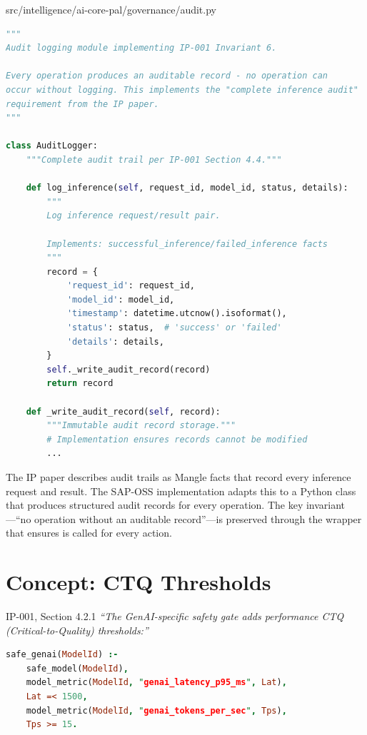 \begin{implbox}{src/intelligence/ai-core-pal/governance/audit.py}
\begin{lstlisting}[language=Python]
"""
Audit logging module implementing IP-001 Invariant 6.

Every operation produces an auditable record - no operation can
occur without logging. This implements the "complete inference audit"
requirement from the IP paper.
"""

class AuditLogger:
    """Complete audit trail per IP-001 Section 4.4."""
    
    def log_inference(self, request_id, model_id, status, details):
        """
        Log inference request/result pair.
        
        Implements: successful_inference/failed_inference facts
        """
        record = {
            'request_id': request_id,
            'model_id': model_id,
            'timestamp': datetime.utcnow().isoformat(),
            'status': status,  # 'success' or 'failed'
            'details': details,
        }
        self._write_audit_record(record)
        return record
    
    def _write_audit_record(self, record):
        """Immutable audit record storage."""
        # Implementation ensures records cannot be modified
        ...
\end{lstlisting}
\end{implbox}

\begin{adaptbox}
The IP paper describes audit trails as Mangle facts that record every inference request and result. The SAP-OSS implementation adapts this to a Python  class that produces structured audit records for every operation. The key invariant---``no operation without an auditable record''---is preserved through the  wrapper that ensures  is called for every action.
\end{adaptbox}

\section{Concept: CTQ Thresholds}
\label{sec:ip001-ctq}

\begin{ipsourcebox}{IP-001, Section 4.2.1}
\textit{``The GenAI-specific safety gate adds performance CTQ (Critical-to-Quality) thresholds:''}

\begin{lstlisting}[language=Prolog,basicstyle=\ttfamily\small]
safe_genai(ModelId) :-
    safe_model(ModelId),
    model_metric(ModelId, "genai_latency_p95_ms", Lat),
    Lat =< 1500,
    model_metric(ModelId, "genai_tokens_per_sec", Tps),
    Tps >= 15.
\end{lstlisting}
\end{ipsourcebox}

